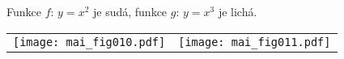 \wikitextrule
\begin{example}\label{MAI:exam024} 
  Funkce $f:\,y=x^2$ je sudá, funkce $g:\,y=x^3$ je lichá.
  
  {\centering
   \begin{tabular}{cc}
     \texttt{[image: mai\_fig010.pdf]}              &
     \texttt{[image: mai\_fig011.pdf]}             \\
  \end{tabular}
  \captionsetup{type=figure}
  \label{MAI:fig_002}
  \par}
\end{example}